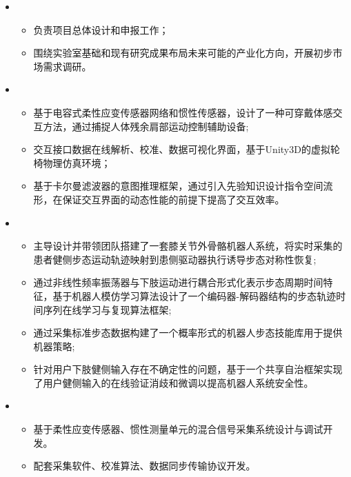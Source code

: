   \begin{itemize}[leftmargin=*]
    \item {}
    {\small
    \begin{itemize}
      \item 负责项目总体设计和申报工作；
      \item 围绕实验室基础和现有研究成果布局未来可能的产业化方向，开展初步市场需求调研。
    \end{itemize}
    }
    
    \item {}
    {\small
      \begin{itemize}
        \item 基于电容式柔性应变传感器网络和惯性传感器，设计了一种可穿戴体感交互方法，通过捕捉人体残余肩部运动控制辅助设备;
        \item 交互接口数据在线解析、校准、数据可视化界面，基于Unity3D的虚拟轮椅物理仿真环境；
        \item 基于卡尔曼滤波器的意图推理框架，通过引入先验知识设计指令空间流形，在保证交互界面的动态性能的前提下提高了交互效率。
      \end{itemize}
    }

    \item {}
    {\small
    \begin{itemize}
      \item 主导设计并带领团队搭建了一套膝关节外骨骼机器人系统，将实时采集的患者健侧步态运动轨迹映射到患侧驱动器执行诱导步态对称性恢复;
      \item 通过非线性频率振荡器与下肢运动进行耦合形式化表示步态周期时间特征，基于机器人模仿学习算法设计了一个编码器-解码器结构的步态轨迹时间序列在线学习与复现算法框架;
      \item 通过采集标准步态数据构建了一个概率形式的机器人步态技能库用于提供机器策略;
      \item 针对用户下肢健侧输入存在不确定性的问题，基于一个共享自治框架实现了用户健侧输入的在线验证消歧和微调以提高机器人系统安全性。
    \end{itemize}
    }

    \item {}
    {\small
    \begin{itemize}
      \item 基于柔性应变传感器、惯性测量单元的混合信号采集系统设计与调试开发。
      \item 配套采集软件、校准算法、数据同步传输协议开发。
    \end{itemize}
    }


\end{itemize}
